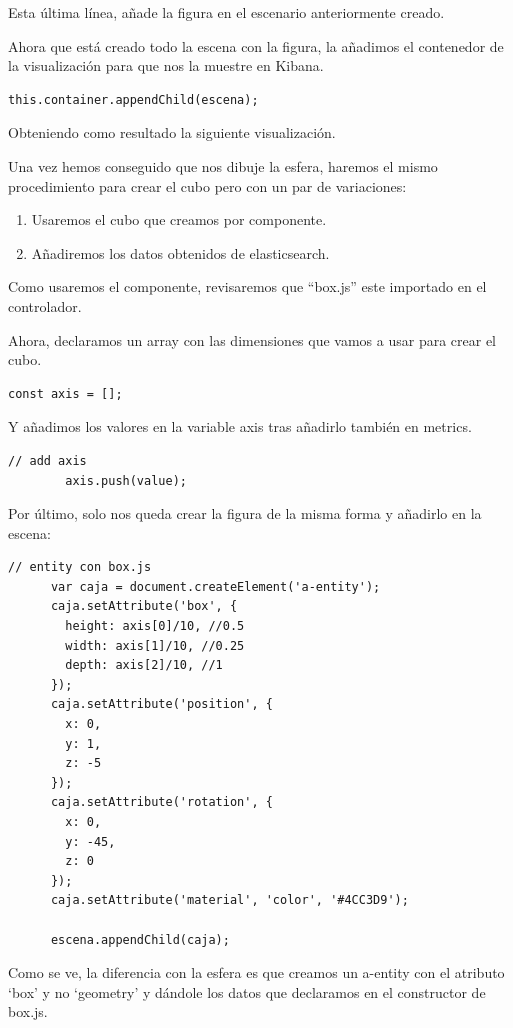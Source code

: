 \documentclass[a4paper, 12pt]{book}
\begin{document}
Esta última línea, añade la figura en el escenario anteriormente creado.

Ahora que está creado todo la escena con la figura, la añadimos el contenedor de la visualización para que nos la muestre en Kibana.

\begin{lstlisting}[frame=single]
     this.container.appendChild(escena);
\end{lstlisting}

Obteniendo como resultado la siguiente visualización.


Una vez hemos conseguido que nos dibuje la esfera, haremos el mismo procedimiento para crear el cubo pero con un par de variaciones:

\begin{enumerate}
    \item Usaremos el cubo que creamos por componente.
    \item Añadiremos los datos obtenidos de elasticsearch.
\end{enumerate}

Como usaremos el componente, revisaremos que “box.js” este importado en el controlador.

Ahora, declaramos un array con las dimensiones que vamos a usar para crear el cubo. 

\begin{lstlisting}[frame=single]
     const axis = [];
\end{lstlisting}
Y añadimos los valores en la variable axis tras añadirlo también en metrics.
\begin{lstlisting}[frame=single]
       // add axis
        axis.push(value);
\end{lstlisting}
Por último, solo nos queda crear la figura de la misma forma y añadirlo en la escena:
\begin{lstlisting}[frame=single]
     // entity con box.js
      var caja = document.createElement('a-entity');
      caja.setAttribute('box', {
        height: axis[0]/10, //0.5
        width: axis[1]/10, //0.25
        depth: axis[2]/10, //1
      });
      caja.setAttribute('position', {
        x: 0,
        y: 1,
        z: -5
      });
      caja.setAttribute('rotation', {
        x: 0,
        y: -45,
        z: 0
      });
      caja.setAttribute('material', 'color', '#4CC3D9');

      escena.appendChild(caja);
\end{lstlisting}
Como se ve, la diferencia con la esfera es que creamos un a-entity con el atributo ‘box’ y no ‘geometry’ y dándole los datos que declaramos en el constructor de box.js.
\end{document}
